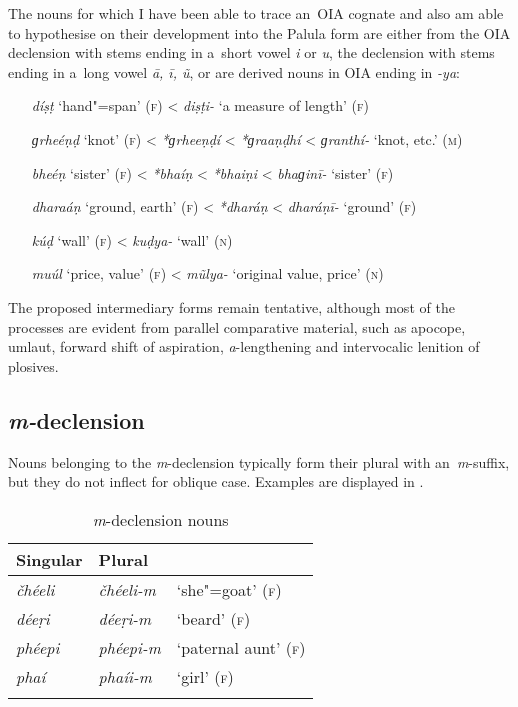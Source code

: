 The nouns for which I have been able to trace an~OIA cognate and also am able to hypothesise on their development into the Palula form are either from the OIA declension with stems ending in a~short vowel \textit{i} or \textit{u}, the declension with stems ending in a~long vowel \textit{ā, ī, ũ}, or are derived nouns in OIA ending in \textit{-ya}: 

\begin{itemize}[itemsep=0pt, leftmargin=]
\item[\textit{díṣṭ} `hand"=span' (\textsc{f})] {\textless} \textit{diṣṭi-} `a measure of length' (\textsc{f})
\item[\textit{ɡrheéṇḍ} `knot' (\textsc{f})] {\textless} \textit{*ɡrheeṇḍí} {\textless} \textit{*ɡraaṇḍhí} {\textless} \textit{ɡranthí-} `knot, etc.' (\textsc{m})
\item[\textit{bheéṇ} `sister' (\textsc{f})] {\textless} \textit{*bhaíṇ} {\textless} \textit{*bhaiṇi} {\textless} \textit{bhaɡinī-} `sister' (\textsc{f})
\item[\textit{dharaáṇ} `ground, earth' (\textsc{f})] {\textless} \textit{*dharáṇ} {\textless} \textit{dharáṇī-} `ground' (\textsc{f})
\item[\textit{kúḍ} `wall' (\textsc{f})] {\textless} \textit{kuḍya-} `wall' (\textsc{n})
\item[\textit{muúl} `price, value' (\textsc{f})] {\textless} \textit{mũlya-} `original value, price' (\textsc{n})
\end{itemize}

The proposed intermediary forms remain tentative, although most of the processes are evident from parallel comparative material, such as apocope, umlaut, forward shift of aspiration, \textit{a}-lengthening and intervocalic lenition of plosives.

\subsection{\textit{m-}declension}
\label{subsec:4-6-3}

Nouns belonging to the \textit{m}-declension typically form their plural with an~\textit{m}-suffix, but they do not inflect for oblique case. Examples are displayed in . 


\begin{table}[ht]
\caption{\textit{m}-declension nouns}
\begin{tabularx}{.75\textwidth}{ Q Q l }
\lsptoprule
Singular &
Plural &
\\\hline
\textit{čhéeli } &
\textit{čhéeli-m} &
`she"=goat' (\textsc{f})\\
\textit{déeṛi} &
\textit{déeṛi-m} &
`beard' (\textsc{f})\\
\textit{phéepi} &
\textit{phéepi-m} &
`paternal aunt' (\textsc{f})\\
\textit{phaí} &
\textit{phaíi-m} &
`girl' (\textsc{f})\\\lspbottomrule
\end{tabularx}
\label{tab:4-16}
\end{table}

